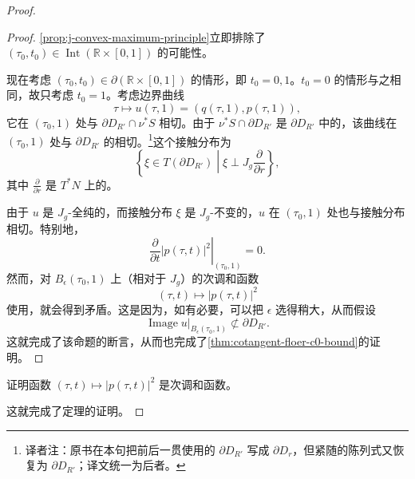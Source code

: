 \begin{proof}
\begin{proof}
\cref{prop:j-convex-maximum-principle}立即排除了 $(\tau_0,t_0)\in\operatorname{Int}(\mathbb R\times[0,1])$ 的可能性。

现在考虑 $(\tau_0,t_0)\in\partial(\mathbb R\times[0,1])$ 的情形，即 $t_0=0,1$。$t_0=0$ 的情形与之相同，故只考虑 $t_0=1$。考虑边界曲线
\[
  \tau\longmapsto u(\tau,1)=(q(\tau,1),p(\tau,1)),
\]
它在 $(\tau_0,1)$ 处与 $\partial D_{R'}\cap\nu^*S$ 相切。由于 $\nu^*S\cap\partial D_{R'}$ 是 $\partial D_{R'}$ 中的\termLegendrianSubmanifold{}，该曲线在 $(\tau_0,1)$ 处与 $\partial D_{R'}$ 的\termContactDistribution{}相切。\footnote{译者注：原书在本句把前后一贯使用的 $\partial D_{R'}$ 写成 $\partial D_r$，但紧随的陈列式又恢复为 $\partial D_{R'}$；译文统一为后者。}这个接触分布为
\[
  \left\{\xi\in T(\partial D_{R'})
    \mathrel{}\middle|\mathrel{}\xi\perp J_g\frac{\partial}{\partial r}\right\},
\]
其中 $\frac{\partial}{\partial r}$ 是 $T^*N$ 上的\termRadialVectorField{}。

由于 $u$ 是 $J_g$-全纯的，而接触分布 $\xi$ 是 $J_g$-不变的，$u$ 在 $(\tau_0,1)$ 处也与接触分布相切。特别地，
\[
  \left.\frac{\partial}{\partial t}|p(\tau,t)|^2\right|_{(\tau_0,1)}=0.
\]
然而，对 $B_\epsilon(\tau_0,1)$ 上（相对于 $J_g$）的次调和函数
\[
  (\tau,t)\longmapsto |p(\tau,t)|^2
\]
使用\termStrongMaximumPrinciple{}，就会得到矛盾。这是因为，如有必要，可以把 $\epsilon$ 选得稍大，从而假设
\[
  \left.\operatorname{Image}u\right|_{B_\epsilon(\tau_0,1)}
  \not\subset\partial D_{R'}.
\]
这就完成了该命题的断言，从而也完成了\cref{thm:cotangent-floer-c0-bound}的证明。
\end{proof}

\begin{exercise}
\label{ex:fiber-norm-subharmonic}
证明函数 $(\tau,t)\longmapsto|p(\tau,t)|^2$ 是次调和函数。
\end{exercise}

这就完成了定理的证明。
\end{proof}
